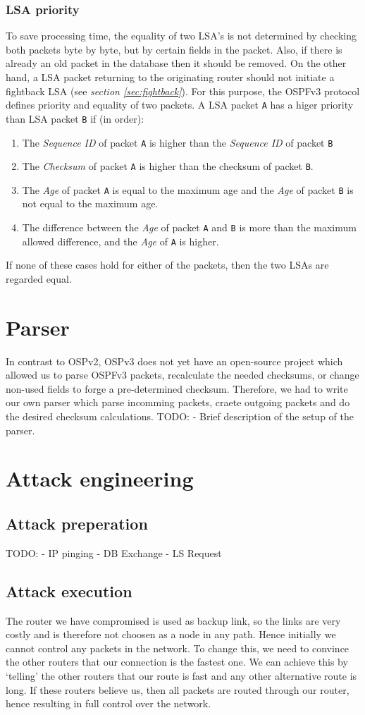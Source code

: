 \documentclass[11pt,a4paper,oneside]{article}
\newcommand{\lsection}[2]{\section{#1}\label{sec:#2}}
\newcommand{\lsubsection}[2]{\subsection{#1}\label{sec:#2}}
\newcommand{\lsubsubsection}[2]{\subsubsection{#1}\label{sec:#2}}
\begin{document}
			\lsubsubsection{LSA priority}{lsa_priority}
				To save processing time, the equality of two LSA's is not determined by checking both packets byte by byte, but by certain fields in the packet. Also, if there is already an old packet in the database then it should be removed. On the other hand, a LSA packet returning to the originating router should not initiate a fightback LSA (see \textit{section \ref{sec:fightback}}). For this purpose, the OSPFv3 protocol defines priority and equality of two packets.
				A LSA packet \texttt{A} has a higer priority than LSA packet \texttt{B} if (in order):
				\begin{enumerate}
					\item The \textit{Sequence ID} of packet \texttt{A} is higher than the \textit{Sequence ID} of packet \texttt{B}
					\item The \textit{Checksum} of packet \texttt{A} is higher than the checksum of packet \texttt{B}.
					\item The \textit{Age} of packet \texttt{A} is equal to the maximum age and the \textit{Age} of packet \texttt{B} is not equal to the maximum age.
					\item The difference between the \textit{Age} of packet \texttt{A} and \texttt{B} is more than the maximum allowed difference, and the \textit{Age} of \texttt{A} is higher.
				\end{enumerate}
				If none of these cases hold for either of the packets, then the two LSAs are regarded equal.
	\lsection{Parser}{parser}
   		In contrast to OSPv2, OSPv3 does not yet have an open-source project which allowed us to parse OSPFv3 packets, recalculate the needed checksums, or change non-used fields to forge a pre-determined checksum. Therefore, we had to write our own parser which parse incomming packets, craete outgoing packets and do the desired checksum calculations.
    		TODO:
    		- Brief description of the setup of the parser.
   		
   	\lsection{Attack engineering}{attack}
   		\lsubsection{Attack preperation}{attack_prep}
   			TODO:
			- IP pinging
	    		- DB Exchange
	    		- LS Request
    			
    			
    		\lsubsection{Attack execution}{attack_exec}
    			The router we have compromised is used as backup link, so the links are very costly and is therefore not choosen as a node in any path. Hence initially we cannot control any packets in the network. To change this, we need to convince the other routers that our connection is the fastest one. We can achieve this by `telling' the other routers that our route is fast and any other alternative route is long. If these routers believe us, then all packets are routed through our router, hence resulting in full control over the network.
    			
\end{document}
